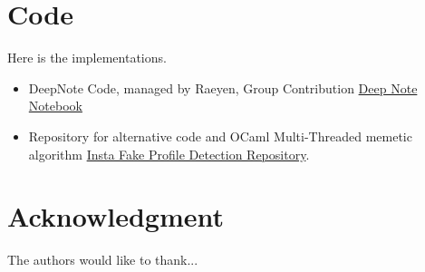 \documentclass[conference]{IEEEtran}
\begin{document}


\appendix

\section{Code}

Here is the implementations.

\begin{itemize}
	\item DeepNote Code, managed by Raeyen, Group Contribution \href{https://deepnote.com/workspace/yes-c049-5ed54f34-9a07-49d4-91a2-b1419cbace6e/project/Raeyen-Nuttalls-Untitled-project-15377316-ffd4-45cc-9912-cba9081d5b2e/notebook/Memetic%20Algorithm-412d34e5cc8042b893fdd10bccc6b6c3}{Deep Note Notebook}
	\item Repository for alternative code and OCaml Multi-Threaded memetic algorithm \href{https://github.com/UTS-Projects-2021-2025/insta-fake-profile-detection}{Insta Fake Profile Detection Repository}.
\end{itemize}

\section*{Acknowledgment}


The authors would like to thank...







%
%
%
\newpage
\printbibliography



\end{document}
